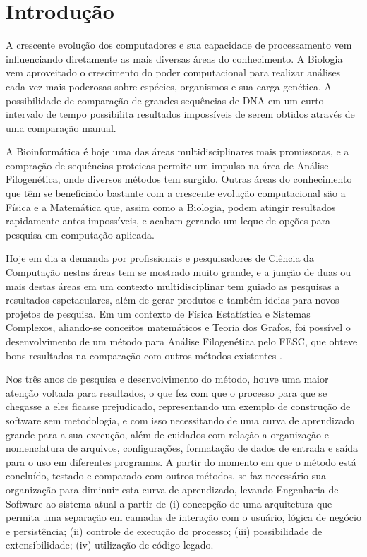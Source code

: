 \chapter{Introdução}

A crescente evolução dos computadores e sua capacidade de processamento vem influenciando diretamente as mais diversas áreas do conhecimento. A Biologia
vem aproveitado o crescimento do poder computacional para realizar análises cada vez mais poderosas sobre espécies, organismos e sua carga genética.
A possibilidade de comparação de grandes sequências de DNA em um curto intervalo de tempo possibilita resultados impossíveis de serem obtidos através
de uma comparação manual.

A Bioinformática é hoje uma das áreas multidisciplinares mais promissoras, e a compração de sequências proteicas permite um impulso na área de Análise
Filogenética, onde diversos métodos tem surgido. Outras áreas do conhecimento que têm se beneficiado bastante com a crescente evolução computacional são a
Física e a Matemática que, assim como a Biologia, podem atingir resultados rapidamente antes impossíveis, e acabam gerando um leque de opções para pesquisa
em computação aplicada.

Hoje em dia a demanda por profissionais e pesquisadores de Ciência da Computação nestas áreas tem se mostrado muito grande, e a junção de duas ou mais destas
áreas em um contexto multidisciplinar tem guiado as pesquisas a resultados espetaculares, além de gerar produtos e também ideias para novos projetos de
pesquisa. Em um contexto de Física Estatística e Sistemas Complexos, aliando-se conceitos matemáticos \cite{andrade2009} e Teoria dos Grafos, foi possível o
desenvolvimento de um método para Análise Filogenética pelo FESC, que obteve bons resultados na comparação com outros métodos existentes \cite{andrade2011}.

Nos três anos de pesquisa e desenvolvimento do método, houve uma maior atenção voltada para resultados, o que fez com que o processo para que se chegasse
a eles ficasse prejudicado, representando um exemplo de construção de software sem metodologia, e com isso necessitando de uma curva de aprendizado grande
para a sua execução, além de cuidados com relação a organização e nomenclatura de arquivos, configurações, formatação de dados de entrada e saída para o
uso em diferentes programas. A partir do momento em que o método está concluído, testado e comparado com outros métodos, se faz necessário sua organização
para diminuir esta curva de aprendizado, levando Engenharia de Software ao sistema atual a partir de (i) concepção de uma arquitetura que permita uma
separação em camadas de interação com o usuário, lógica de negócio e persistência; (ii) controle de execução do processo; (iii) possibilidade de
extensibilidade; (iv) utilização de código legado.

